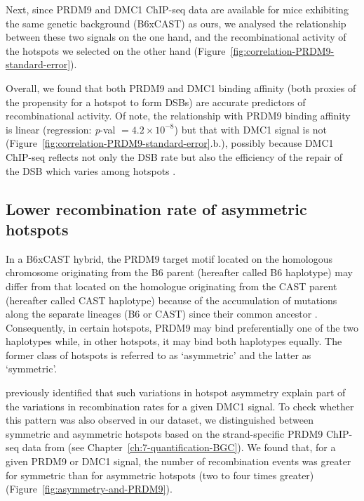 Next, since PRDM9 \citep{baker2015prdm9} and DMC1 \citep{smagulova2016evolutionary} ChIP-seq data are available for mice exhibiting the same genetic background (B6xCAST) as ours, we analysed the relationship between these two signals on the one hand, and the recombinational activity of the hotspots we selected on the other hand (Figure~\ref{fig:correlation-PRDM9-standard-error}).

Overall, we found that both PRDM9 and DMC1 binding affinity (both proxies of the propensity for a hotspot to form DSBs) are accurate predictors of recombinational activity.
Of note, the relationship with PRDM9 binding affinity is linear (regression: \textit{p}-val $= 4.2 \times 10^{-8}$) but that with DMC1 signal is not (Figure~\ref{fig:correlation-PRDM9-standard-error}.b.), possibly because DMC1 ChIP-seq reflects not only the DSB rate but also the efficiency of the repair of the DSB which varies among hotspots \citep{lange2016landscape,davies2016reengineering}.


\subsection{Lower recombination rate of asymmetric hotspots}


In a B6xCAST hybrid, the PRDM9 target motif located on the homologous chromosome originating from the B6 parent (hereafter called B6 haplotype) may differ from that located on the homologue originating from the CAST parent (hereafter called CAST haplotype) because of the accumulation of mutations along the separate lineages (B6 or CAST) since their common ancestor \citep{davies2016reengineering,smagulova2016evolutionary}.
Consequently, in certain hotspots, PRDM9 may bind preferentially one of the two haplotypes while, in other hotspots, it may bind both haplotypes equally.
The former class of hotspots is referred to as ‘asymmetric’ and the latter as ‘symmetric’.

\citet{li2018highresolution} previously identified that such variations in hotspot asymmetry explain part of the variations in recombination rates for a given DMC1 signal.
To check whether this pattern was also observed in our dataset, we distinguished between symmetric and asymmetric hotspots based on the strand-specific PRDM9 ChIP-seq data from \citet{baker2015prdm9} (see Chapter~\ref{ch:7-quantification-BGC}).
We found that, for a given PRDM9 or DMC1 signal, the number of recombination events was greater for symmetric than for asymmetric hotspots (two to four times greater) (Figure~\ref{fig:asymmetry-and-PRDM9}).

